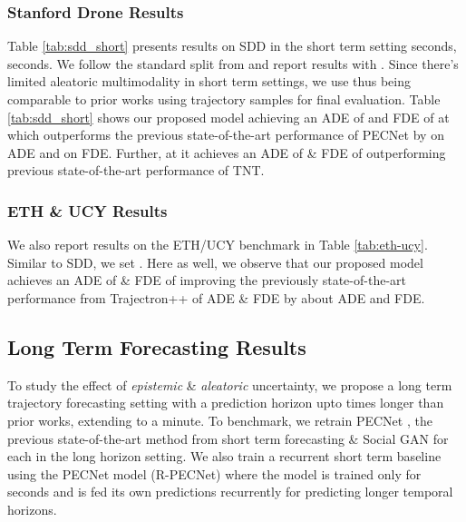 \documentclass[final]{cvpr}
\begin{document}
\subsubsection{Stanford Drone Results} Table \ref{tab:sdd_short} presents results on SDD in the short term setting \ie  seconds,  seconds. We follow the standard split from \cite{sadeghian2018trajnet} and report results with . Since there's limited aleatoric multimodality in short term settings, we use  thus being comparable to prior works using  trajectory samples for final evaluation. Table \ref{tab:sdd_short} shows our proposed model achieving an ADE of  and FDE of  at  which outperforms the previous state-of-the-art performance of PECNet \cite{mangalam2020not} by  on ADE and  on FDE. Further, at  it achieves an ADE of  \& FDE of  outperforming previous state-of-the-art performance of TNT. 

\subsubsection{ETH \& UCY Results} We also report results on the ETH/UCY benchmark in Table \ref{tab:eth-ucy}. Similar to SDD, we set . Here as well, we observe that our proposed model achieves an ADE of  \& FDE of  improving the previously state-of-the-art performance from Trajectron++ \cite{salzmann2020trajectron++} of  ADE \&  FDE by about  ADE and  FDE. 

\subsection{Long Term Forecasting Results}
To study the effect of \textit{epistemic} \& \textit{aleatoric} uncertainty, we propose a long term trajectory forecasting setting with a prediction horizon upto  times longer than prior works, extending to a minute. To benchmark, we retrain PECNet \cite{mangalam2020not}, the previous state-of-the-art method from short term forecasting \& Social GAN \cite{gupta2018social} for each  in the long horizon setting. We also train a recurrent short term baseline using the PECNet model (R-PECNet) where the model is trained only for  seconds and is fed its own predictions recurrently for predicting longer temporal horizons. 
\end{document}
